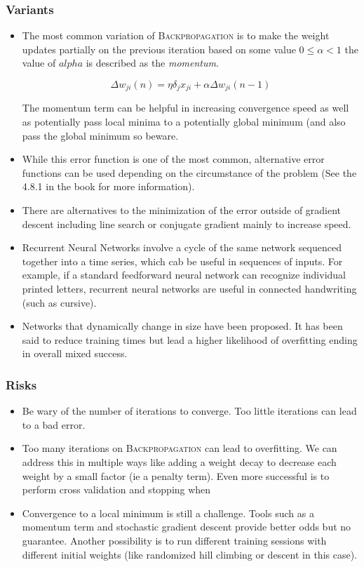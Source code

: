 \documentclass[titlepage,11pt]{article}
\begin{document}
\subsubsection{Variants}

\begin{itemize}
\item The most common variation of \textsc{Backpropagation} is to make the weight updates partially on the previous iteration based on some value $0 \leq \alpha < 1$ the value of $alpha$ is described as the \textit{momentum}.

\begin{equation}
\Delta w_{ji}(n)= \eta \delta_jx_{ji} +\alpha \Delta w_{ji} (n-1)
\end{equation}

The momentum term can be helpful in increasing convergence speed as well as potentially pass local minima to a potentially global minimum (and also pass the global minimum so beware.

\item While this error function is one of the most common, alternative error functions can be used depending on the circumstance of the problem (See the 4.8.1 in the book for more information).
\item There are alternatives to the minimization of the error outside of gradient descent including line search or conjugate gradient mainly to increase speed.
\item Recurrent Neural Networks involve a cycle of the same network sequenced together into a time series, which cab be useful in sequences of inputs. For example, if a standard feedforward neural network can recognize individual printed letters, recurrent neural networks are useful in connected handwriting (such as cursive).
\item Networks that dynamically change in size have been proposed. It has been said to reduce training times but lead a higher likelihood of overfitting ending in overall mixed success.
\end{itemize}

\subsubsection{Risks}

\begin{itemize}
\item Be wary of the number of iterations to converge. Too little iterations can lead to a bad error.
\item Too many iterations on \textsc{Backpropagation} can lead to overfitting. We can address this in multiple ways like adding a weight decay to decrease each weight by a small factor (ie a penalty term). Even more successful is to perform cross validation and stopping when 
\item Convergence to a local minimum is still a challenge. Tools such as a momentum term and stochastic gradient descent provide better odds but no guarantee. Another possibility is to run different training sessions with different initial weights (like randomized hill climbing or descent in this case).
\end{itemize}
\end{document}
